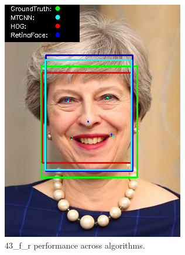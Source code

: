 \documentclass{l4proj}
\begin{document}
\begin{appendices}
\begin{figure}[h!]
\begin{minipage}{0.49\textwidth}
     \includegraphics[width=\textwidth]{images/appendix/43.png}
    \caption{43\_f\_r performance across algorithms.}
    \label{whoopi_result}
  \end{minipage}
\end{figure}


\end{appendices}
\end{document}
